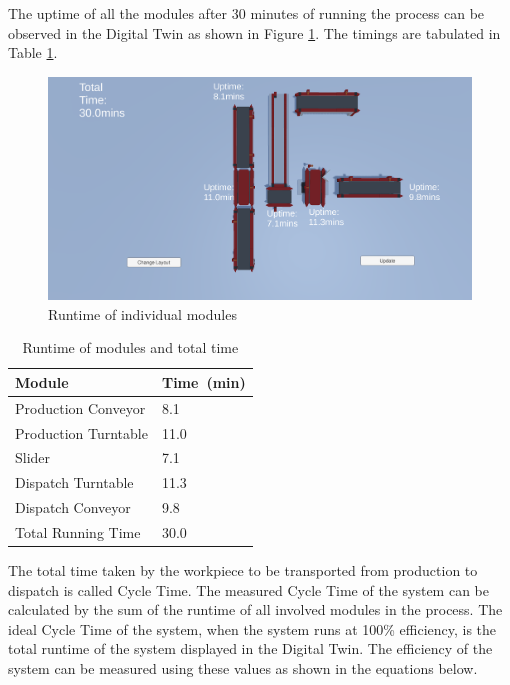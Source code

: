 The uptime of all the modules after 30 minutes of running the process can be observed in the Digital Twin as shown in Figure \ref{fig:runtime}. The timings are tabulated in Table \ref{tab:efficiency}.

\begin{figure}
    \centering
    \includegraphics[scale=0.35]{images/Runtimes.png}
    \caption{Runtime of individual modules}
    \label{fig:runtime}
\end{figure}

\begin{table}[h!]
    \centering
\begin{tabular}{ | m{4cm} | m{2cm} | } 
  \hline
  \textbf{Module}&\textbf{Time\ (min)} \\ 
  \hline
  Production Conveyor&8.1 \\ 
  \hline
  Production Turntable& 11.0 \\ 
  \hline
  Slider&7.1 \\
  \hline
  Dispatch Turntable&11.3 \\
  \hline
  Dispatch Conveyor&9.8 \\
  \hline
  Total Running Time&30.0 \\
  \hline
\end{tabular}
    \caption{Runtime of modules and total time}
    \label{tab:efficiency}
\end{table}

The total time taken by the workpiece to be transported from production to dispatch is called Cycle Time. The measured Cycle Time of the system can be calculated by the sum of the runtime of all involved modules in the process. The ideal Cycle Time of the system, when the system runs at 100\% efficiency, is the total runtime of the system displayed in the Digital Twin. The efficiency of the system can be measured using these values as shown in the equations below.

